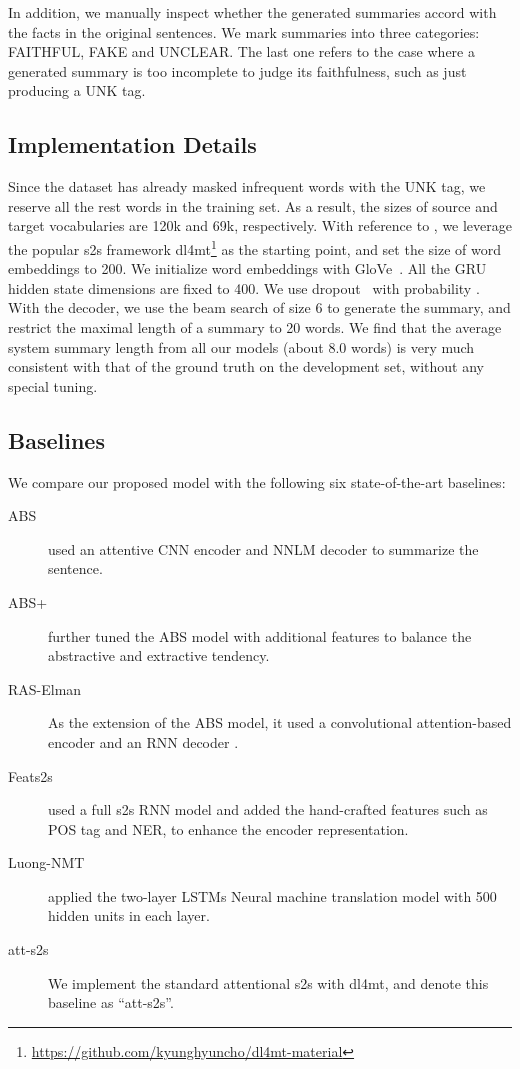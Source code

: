 \documentclass[letterpaper]{article} \usepackage{aaai18}  \usepackage{times}  \usepackage{helvet}  \usepackage{courier}  \usepackage{url}  \usepackage{graphicx}  \usepackage{amsfonts}
\begin{document}
	In addition, we manually inspect whether the generated summaries accord with the facts in the original sentences.
	We mark summaries into three categories: FAITHFUL, FAKE and UNCLEAR.
	The last one refers to the case where a generated summary is too incomplete to judge its faithfulness, such as just producing a UNK tag.
	
	\subsection{Implementation Details}
	Since the dataset has already masked infrequent words with the UNK tag, we reserve all the rest words in the training set.
	As a result, the sizes of source and target vocabularies are 120k and 69k, respectively. 
	With reference to \cite{nallapati2016abstractive}, we leverage the popular s2s framework dl4mt\footnote{\url{https://github.com/kyunghyuncho/dl4mt-material}} as the starting point, and set the size of word embeddings to 200.
	We initialize word embeddings with GloVe~\cite{pennington2014glove}.
	All the GRU hidden state dimensions are fixed to 400.
	We use dropout~\cite{srivastava2014dropout} with probability .
	With the decoder, we use the beam search of size 6 to generate the summary, and restrict the maximal length of a summary to 20 words.
	We find that the average system summary length from all our models (about 8.0 words) is very much consistent with that of the ground truth on the development set, without any special tuning. 
	
	
	\subsection{Baselines}
	We compare our proposed model with the following six state-of-the-art baselines:
	\begin{description}
		\item[ABS] \cite{rush2015neural} used an attentive CNN encoder and NNLM decoder to summarize the sentence.
		\item[ABS+] \cite{rush2015neural}
		further tuned the ABS model with additional features to balance
		the abstractive and extractive tendency.
		\item[RAS-Elman] As the extension of the ABS model, it used a convolutional attention-based encoder and an RNN decoder \cite{chopra2016abstractive}.
		\item[Feats2s]  \cite{nallapati2016abstractive} used a full
		s2s RNN model and added the hand-crafted features such as POS tag and NER, to enhance the encoder representation.
		\item[Luong-NMT] \cite{luong2015effective} applied the two-layer LSTMs Neural machine translation model with 500 hidden
		units in each layer.
		\item[att-s2s] We implement the standard attentional s2s with dl4mt, and denote this baseline as ``att-s2s''.
	\end{description}
	
\end{document}
